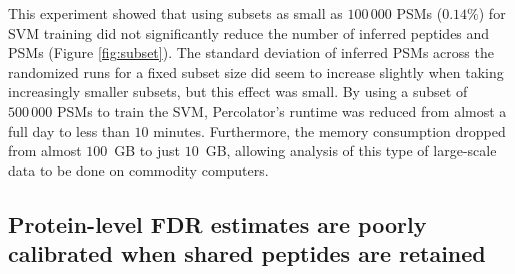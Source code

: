 \documentclass{article}
\begin{document}
This experiment showed that using subsets as small as $100\,000$ PSMs
($0.14\%$) for SVM training did not significantly reduce the number of
inferred peptides and PSMs (Figure \ref{fig:subset}). The standard
deviation of inferred PSMs across the randomized runs for a fixed
subset size did seem to increase slightly when taking increasingly
smaller subsets, but this effect was small. By using a subset of
$500\,000$ PSMs to train the SVM, Percolator's runtime was reduced
from almost a full day to less than $10$ minutes. Furthermore, the
memory consumption dropped from almost $100$~GB to just $10$~GB,
allowing analysis of this type of large-scale data to be done on
commodity computers.

\subsection*{Protein-level FDR estimates are poorly calibrated when
  shared peptides are retained}
\end{document}
